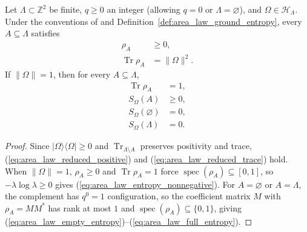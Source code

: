 \begin{lemma}
    \label{thm:area_law_regional_state_identities}
    \leanok
    Let $\Lambda\subset\mathbb Z^2$ be finite, $q\ge0$ an integer (allowing
    $q=0$ or $\Lambda=\varnothing$), and $\Omega\in\mathcal H_\Lambda$. Under
    the conventions of \cite[Section~2]{OpenAI2026AreaLaw} and
    Definition~\ref{def:area_law_ground_entropy}, every $A\subseteq\Lambda$
    satisfies
    \begin{align}
        \rho_A                  & \ge0,
        \label{eq:area_law_reduced_positive}     \\
        \operatorname{Tr}\rho_A & =\|\Omega\|^2.
        \label{eq:area_law_reduced_trace}
    \end{align}
    If $\|\Omega\|=1$, then for every $A\subseteq\Lambda$,
    \begin{align}
        \operatorname{Tr}\rho_A & =1,
        \label{eq:area_law_reduced_unit_trace}  \\
        S_\Omega(A)             & \ge0,
        \label{eq:area_law_entropy_nonnegative} \\
        S_\Omega(\varnothing)   & =0,
        \label{eq:area_law_empty_entropy}       \\
        S_\Omega(\Lambda)       & =0.
        \label{eq:area_law_full_entropy}
    \end{align}
\end{lemma}
\begin{proof}\leanok
    Since $|\Omega\rangle\langle\Omega|\ge0$ and $\operatorname{Tr}_{\Lambda\setminus A}$
    preserves positivity and trace, (\ref{eq:area_law_reduced_positive}) and
    (\ref{eq:area_law_reduced_trace}) hold. When $\|\Omega\|=1$, $\rho_A\ge0$
    and $\operatorname{Tr}\rho_A=1$ force $\operatorname{spec}(\rho_A)\subseteq[0,1]$,
    so $-\lambda\log\lambda\ge0$ gives (\ref{eq:area_law_entropy_nonnegative}).
    For $A=\varnothing$ or $A=\Lambda$, the complement has $q^0=1$ configuration,
    so the coefficient matrix $M$ with $\rho_A=MM^*$ has rank at most $1$ and
    $\operatorname{spec}(\rho_A)\subseteq\{0,1\}$, giving
    (\ref{eq:area_law_empty_entropy})--(\ref{eq:area_law_full_entropy}).
\end{proof}

